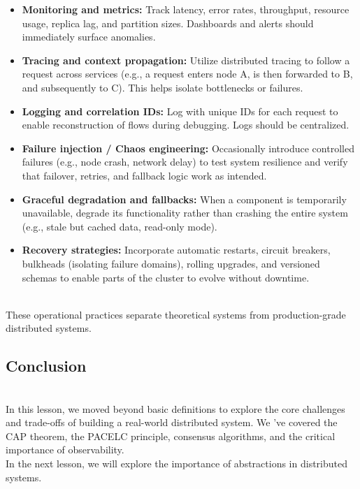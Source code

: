 \begin{itemize}
\item
\protect{}\label{xDd8JmwfHexI_wfVcjaMc}
\textbf{Monitoring and metrics:} Track latency, error rates, throughput, resource usage, replica lag, and partition sizes. Dashboards and alerts should immediately surface anomalies.
\item
\protect{}\label{M3AT8Wb7HA-7EX3PDhrGD}
\textbf{Tracing and context propagation:} Utilize distributed tracing to follow a request across services (e.g., a request enters node A, is then forwarded to B, and subsequently to C). This helps isolate bottlenecks or failures.
\item
\protect{}\label{FDGJrifrZmq1Mbkbtl7kd}
\textbf{Logging and correlation IDs:} Log with unique IDs for each request to enable reconstruction of flows during debugging. Logs should be centralized.
\item
\protect{}\label{3UMAfcCHppXapv5oax3t5}
\textbf{Failure injection / Chaos engineering:} Occasionally introduce controlled failures (e.g., node crash, network delay) to test system resilience and verify that failover, retries, and fallback logic work as intended.
\item
\protect{}\label{FVvVq2eeWC3mi7L7Px2Z5}
\textbf{Graceful degradation and fallbacks:} When a component is temporarily unavailable, degrade its functionality rather than crashing the entire system (e.g., stale but cached data, read-only mode).
\item
\protect{}\label{5svuig-RUZbahxvdzXVOn}
\textbf{Recovery strategies:} Incorporate automatic restarts, circuit breakers, bulkheads (isolating failure domains), rolling upgrades, and versioned schemas to enable parts of the cluster to evolve without downtime.
\end{itemize}
\\
These operational practices separate theoretical systems from production-grade distributed systems.

\subsection{Conclusion}\label{ADIFWDNI0jwJOo4PEW4Hh}
\\
In this lesson, we moved beyond basic definitions to explore the core challenges and trade-offs of building a real-world distributed system. We 've covered the CAP theorem, the PACELC principle, consensus algorithms, and the critical importance of observability.
\\
In the next lesson, we will explore the importance of abstractions in distributed systems.

